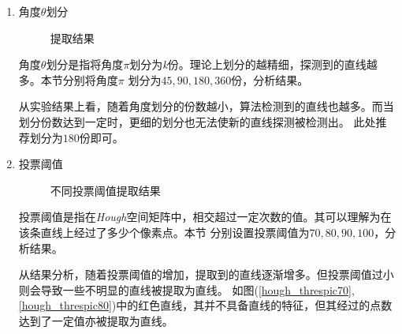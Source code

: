     \begin{enumerate}
        \item 角度$\theta$划分
        
        \begin{figure}[H]
            \centering
            \caption{提取结果}
            \label{hough_thetapic}
        \end{figure}

        \hspace{20pt}角度$\theta$划分是指将角度$\pi$划分为\textit{k}份。理论上划分的越精细，探测到的直线越多。本节分别将角度$\pi$
        划分为$45,90,180,360$份，分析结果。

        \hspace{20pt}从实验结果上看，随着角度划分的份数越小，算法检测到的直线也越多。而当划分份数达到一定时，更细的划分也无法使新的直线探测被检测出。
        此处推荐划分为$180$份即可。

        \item 投票阈值
        
        \begin{figure}[H]
            \centering
            \caption{不同投票阈值提取结果}
            \label{hough_threspic}
        \end{figure}

        \hspace{20pt}投票阈值是指在\textit{Hough}空间矩阵中，相交超过一定次数的值。其可以理解为在该条直线上经过了多少个像素点。本节
        分别设置投票阈值为$70,80,90,100$，分析结果。

        \hspace{20pt}从结果分析，随着投票阈值的增加，提取到的直线逐渐增多。但投票阈值过小则会导致一些不明显的直线被提取为直线。
        如图(\ref{hough_threspic70},\ref{hough_threspic80})中的红色直线，其并不具备直线的特征，但其经过的点数达到了一定值亦被提取为直线。

    \end{enumerate}

